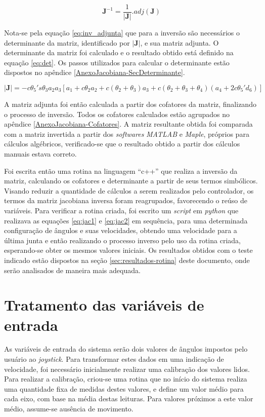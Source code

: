 \begin{equation}
    \label{eq:inv_adjunta}
    \textbf{J}^{-1}  = \frac{1}{|\textbf{J}|}.adj(\textbf{J})
\end{equation}

Nota-se pela equação \ref{eq:inv_adjunta} que para a inversão são necessários o determinante da matriz,
identificado por $|\textbf{J}|$, e sua matriz adjunta. O determinante da matriz foi calculado e o resultado obtido
está definido na equação \ref{eq:det}. Os passos utilizados para calcular o determinante estão dispostos no apêndice
\ref{AnexoJacobiana-SecDeterminante}.

\begin{equation}
    \label{eq:det}
    |\textbf{J}| = -c\theta_5's\theta_3a_2a_3[a_1+c\theta_2a_2+c(\theta_2+\theta_3)a_3+c(\theta_2+\theta_3+\theta_4)(a_4+2c\theta_5'd_6)]  
\end{equation}

A matriz adjunta foi então calculada a partir dos cofatores da matriz, finalizando o 
processo de inversão. Todos os cofatores calculados estão agrupados no apêndice \ref{AnexoJacobiana-Cofatores}.
A matriz resultante obtida foi comparada com a matriz invertida a partir dos \textit{softwares}
\textit{MATLAB} e \textit{Maple}, próprios para cálculos algébricos, verificado-se que o 
resultado obtido a partir dos cálculos manuais estava correto.

Foi escrita então uma rotina na linguagem ``c++'' que realiza a inversão da 
matriz, calculando os cofatores e determinante a partir de seus termos simbólicos. 
Visando reduzir a quantidade de cálculos a serem realizados pelo controlador, os termos da 
matriz jacobiana inversa foram reagrupados, favorecendo o reúso de variáveis.
Para verificar a rotina criada, foi escrito um \textit{script} em \textit{python}
que realizava as equações \ref{eq:jac1} e \ref{eq:jac2} em sequência, para uma 
determinada configuração de ângulos e suas velocidades, obtendo uma velocidade para 
a última junta e então realizando o processo inverso pelo uso da rotina criada, esperando-se 
obter os mesmos valores iniciais. Os resultados obtidos com o teste indicado estão
dispostos na seção \ref{sec:resultados-rotina} deste documento, onde serão analisados
de maneira mais adequada.

\section{Tratamento das variáveis de entrada}
As variáveis de entrada do sistema serão dois valores de ângulos impostos pelo
usuário ao \textit{joystick}. Para transformar estes dados em uma indicação de 
velocidade, foi necessário inicialmente realizar uma calibração dos valores lidos.
Para realizar a calibração, criou-se uma rotina que no início do sistema 
realiza uma quantidade fixa de medidas destes valores, e define um valor médio para
cada eixo, com base na média destas leituras. Para valores próximos a este valor médio,
assume-se ausência de movimento.

